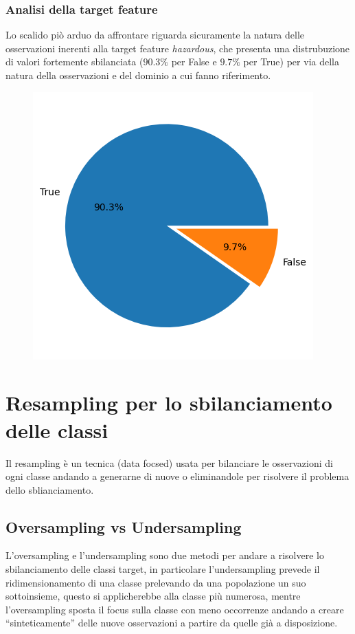 \documentclass[italian,12pt,a4paper]{article}
\begin{document}
	
	\subsubsection{Analisi della target feature}
	Lo scalido piò arduo da affrontare riguarda sicuramente la natura delle osservazioni inerenti alla target feature \textit{hazardous}, che presenta una distrubuzione di valori fortemente sbilanciata ($90.3\%$ per False e $9.7\%$ per True) per via della natura della osservazioni e del dominio a cui fanno riferimento.
	
	\begin{center}
		\begin{figure}[!ht]
			\centering
			\includegraphics[scale=0.73]{imbcalss}
		\end{figure}
	\end{center}

	\section{Resampling per lo sbilanciamento delle classi}
	Il resampling è un tecnica (data focsed) usata per bilanciare le osservazioni di ogni classe andando a generarne di nuove o eliminandole per risolvere il problema dello sblianciamento.
	
	\subsection{Oversampling vs Undersampling}

	L’oversampling e l’undersampling sono due metodi per andare a risolvere lo sbilanciamento delle classi target, in particolare l’undersampling prevede il ridimensionamento di una classe prelevando da una popolazione un suo sottoinsieme, questo si applicherebbe alla classe più numerosa, mentre l’oversampling sposta il focus sulla classe con meno occorrenze andando a creare “sinteticamente” delle nuove osservazioni a partire da quelle già a disposizione.
	
\end{document}

